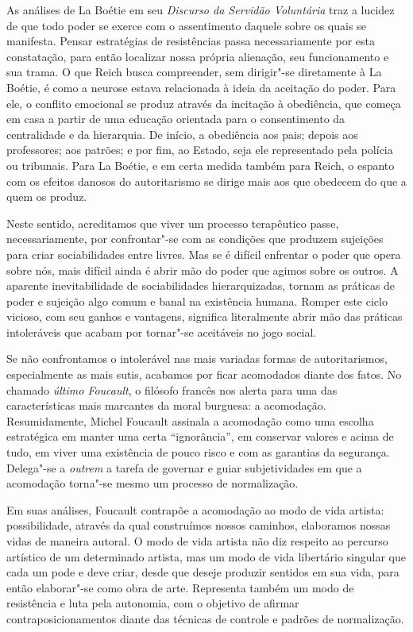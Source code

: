 As análises de La Boétie em seu \emph{Discurso da Servidão Voluntária}
traz a lucidez de que todo poder se exerce com o assentimento daquele
sobre os quais se manifesta. Pensar estratégias de resistências passa
necessariamente por esta constatação, para então localizar nossa própria
alienação, seu funcionamento e sua trama. O que Reich busca compreender,
sem dirigir"-se diretamente à La Boétie, é como a neurose estava
relacionada à ideia da aceitação do poder. Para ele, o conflito
emocional se produz através da incitação à obediência, que começa em
casa a partir de uma educação orientada para o consentimento da
centralidade e da hierarquia. De início, a obediência aos pais; depois
aos professores; aos patrões; e por fim, ao Estado, seja ele
representado pela polícia ou tribunais. Para La Boétie, e em certa
medida também para Reich, o espanto com os efeitos danosos do
autoritarismo se dirige mais aos que obedecem do que a quem os produz.

Neste sentido, acreditamos que viver um processo terapêutico passe,
necessariamente, por confrontar"-se com as condições que produzem
sujeições para criar sociabilidades entre livres. Mas se é difícil
enfrentar o poder que opera sobre nós, mais difícil ainda é abrir mão do
poder que agimos sobre os outros. A aparente inevitabilidade de
sociabilidades hierarquizadas, tornam as práticas de poder e sujeição
algo comum e banal na existência humana. Romper este ciclo vicioso, com
seu ganhos e vantagens, significa literalmente abrir mão das práticas
intoleráveis que acabam por tornar"-se aceitáveis no jogo social.

Se não confrontamos o intolerável nas mais variadas formas de
autoritarismos, especialmente as mais sutis, acabamos por ficar
acomodados diante dos fatos. No chamado \emph{último Foucault}, o
filósofo francês nos alerta para uma das características mais marcantes
da moral burguesa: a acomodação. Resumidamente, Michel Foucault assinala
a acomodação como uma escolha estratégica em manter uma certa
``ignorância'', em conservar valores e acima de tudo, em viver uma
existência de pouco risco e com as garantias da segurança. Delega"-se a
\emph{outrem} a tarefa de governar e guiar subjetividades em que a
acomodação torna"-se mesmo um processo de normalização.

Em suas análises, Foucault contrapõe a acomodação ao modo de vida
artista: possibilidade, através da qual construímos nossos caminhos,
elaboramos nossas vidas de maneira autoral. O modo de vida artista não
diz respeito ao percurso artístico de um determinado artista, mas um
modo de vida libertário singular que cada um pode e deve criar, desde
que deseje produzir sentidos em sua vida, para então elaborar"-se como
obra de arte. Representa também um modo de resistência e luta pela
autonomia, com o objetivo de afirmar contraposicionamentos diante das
técnicas de controle e padrões de normalização.

